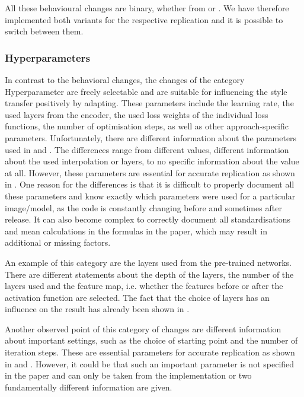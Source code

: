 All these behavioural changes are binary, whether from \paper{} or \implementation{}. We have therefore implemented both variants for the respective replication and it is possible to switch between them.

\subsubsection{Hyperparameters}
In contrast to the behavioral changes, the changes of the category Hyperparameter are freely selectable and are suitable for influencing the style transfer positively by adapting. These parameters include the learning rate, the used layers from the encoder, the used loss weights of the individual loss functions, the number of optimisation steps, as well as other approach-specific parameters. Unfortunately, there are different information about the parameters used in \paper{} and \implementation{}. The differences range from different values, different information about the used interpolation or layers, to no specific information about the value at all. However, these parameters are essential for accurate replication as shown in . One reason for the differences is that it is difficult to properly document all these parameters and know exactly which parameters were used for a particular image/model, as the code is constantly changing before and sometimes after release. It can also become complex to correctly document all standardisations and mean calculations in the formulas in the paper, which may result in additional or missing factors. 

An example of this category are the layers used from the pre-trained networks. There are different statements about the depth of the layers, the number of the layers used and the feature map, i.e. whether the features before or after the activation function are selected. The fact that the choice of layers has an influence on the result has already been shown in . 

Another observed point of this category of changes are different information about important settings, such as the choice of starting point and the number of iteration steps. These are essential parameters for accurate replication as shown in  and . However, it could be that such an important parameter is not specified in the paper and can only be taken from the implementation or two fundamentally different information are given.  

